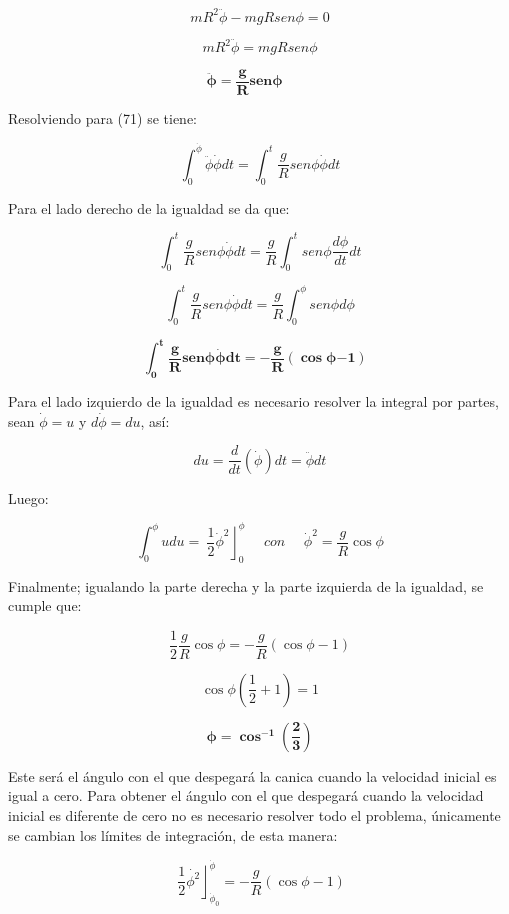 \documentclass[]{article}
\begin{document}
\[mR^{2}\ddot{\phi} - mgR{sen}{\phi = 0}\]

\[mR^{2}\ddot{\phi} = mgR{sen}\phi\]

\[\ddot{\mathbf{\phi}}\mathbf{=}\frac{\mathbf{g}}{\mathbf{R}}\mathbf{sen}\mathbf{\phi}\mathbf{\ \ \ \ \ \ \ \ \ \ }\]

Resolviendo para (71) se tiene:

\[\int_{0}^{\dot{\phi}}\ddot{\phi}\dot{\phi}dt = \int_{0}^{t}{\frac{g}{R}{sen}\phi}\dot{\phi}dt\]

Para el lado derecho de la igualdad se da que:

\[\int_{0}^{t}{\frac{g}{R}{sen}\phi}\dot{\phi}dt = \frac{g}{R}\int_{0}^{t}{{sen}\phi}\frac{d\phi}{dt}dt\]

\[\int_{0}^{t}{\frac{g}{R}{sen}\phi}\dot{\phi}dt = \frac{g}{R}\int_{0}^{\phi}{{sen}\phi}d\phi\]

\[\int_{\mathbf{0}}^{\mathbf{t}}{\frac{\mathbf{g}}{\mathbf{R}}\mathbf{sen}\mathbf{\phi}}\dot{\mathbf{\phi}}\mathbf{dt = -}\frac{\mathbf{g}}{\mathbf{R}}\left( \mathbf{\cos}\mathbf{\phi}\mathbf{- 1} \right)\mathbf{\ \ \ }\]

Para el lado izquierdo de la igualdad es necesario resolver la integral
por partes, sean \(\dot{\phi} = u\) y \(d\dot{\phi} = du\), así:

\[du = \frac{d}{dt}\left( \dot{\phi} \right)dt = \ddot{\phi}dt\]

Luego:

\[\int_{0}^{\phi}{udu =}\left. \ \frac{1}{2}{\dot{\phi}}^{2} \right\rfloor_{0}^{\phi}\ \ \ \ \ \ con\ \ \ \ \ \ {\dot{\phi}}^{2} = \frac{g}{R}\cos\phi\]

Finalmente; igualando la parte derecha y la parte izquierda de la
igualdad, se cumple que:

\[\frac{1}{2}\frac{g}{R}\cos\phi = - \frac{g}{R}\left( \cos\phi - 1 \right)\]

\[\cos\phi\left( \frac{1}{2} + 1 \right) = 1\]

\[\mathbf{\phi =}\mathbf{\cos}^{\mathbf{- 1}}\left( \frac{\mathbf{2}}{\mathbf{3}} \right)\]

Este será el ángulo con el que despegará la canica cuando la velocidad
inicial es igual a cero. Para obtener el ángulo con el que despegará
cuando la velocidad inicial es diferente de cero no es necesario
resolver todo el problema, únicamente se cambian los límites de
integración, de esta manera:

\[\left. \ \frac{1}{2}\dot{\phi^{2}} \right\rfloor_{{\dot{\phi}}_{0}}^{\dot{\phi}} = - \frac{g}{R}\left( \cos\phi - 1 \right)\]
\end{document}
